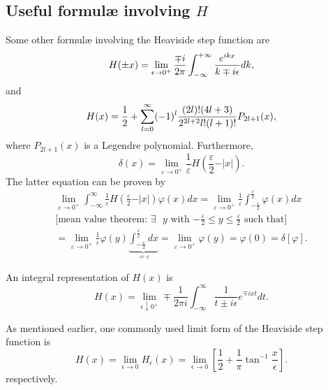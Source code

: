 \subsection{Useful formul\ae{} involving $H$}

Some other formul\ae{}  involving the Heaviside step function
are
 \begin{equation}
H (\pm x)=\lim_{\epsilon \rightarrow 0^+}{\mp i\over 2\pi
 }\int_{-\infty}^{+\infty} {e^{ikx}\over k\mp i\epsilon}dk,
 \end{equation}
and
 \begin{equation}
H (x)
={1\over 2}
+
\sum_{l=0}^\infty (-1)^l {(2l)!(4l+3)\over 2^{2l+2}l!(l+1)!}
P_{2l+1} (x),
 \end{equation}
where $P_{2l+1} (x)$ is a Legendre polynomial.
Furthermore,
\begin{equation}
\delta(x)=
\lim_{\varepsilon \rightarrow 0^+}  \frac{1}{\varepsilon } H\left( \frac{\varepsilon }{2} -\vert x\vert\right) .
\end{equation}
{\color{OliveGreen}
\bproof
The latter equation can
be proven by
\begin{equation}
\begin{split}
\lim_{\varepsilon \rightarrow 0^+}  \int_{-\infty}^\infty
\frac{1}{\varepsilon } H\left( \frac{\varepsilon }{2} -\vert x\vert\right) \varphi(x) dx
=
\lim_{\varepsilon \rightarrow 0^+} \frac{1}{\varepsilon } \int_{-\frac{\varepsilon}{2}}^{\frac{\varepsilon}{2}}
\varphi(x) dx
\\
\textrm{[mean value theorem: $\exists$  $y$ with $-\frac{\varepsilon}{2}\le y \le \frac{\varepsilon}{2}$ such that]} \\
=\lim_{\varepsilon \rightarrow 0^+} \frac{1}{\varepsilon }\varphi(y) \underbrace{\int_{-\frac{\varepsilon}{2}}^{\frac{\varepsilon}{2}} dx}_{=\varepsilon }
=\lim_{\varepsilon \rightarrow 0^+}  \varphi(y)  =   \varphi(0) =\delta [\varphi ].
\end{split}
\end{equation}
\eproof
}

An integral representation of $H(x)$ is
 \begin{equation}
H (x)
=\lim_{\epsilon \downarrow 0^+} \mp \frac{1}{2\pi i}
\int_{-\infty}^\infty
 \frac{1}{t \pm i\epsilon}e^{\mp ixt} dt.
 \end{equation}


As mentioned earlier, one commonly used limit form  of the Heaviside step function is
\begin{equation}
H(x)= \lim_{\epsilon \rightarrow 0} H_\epsilon (x)=\lim_{\epsilon \rightarrow 0}   \left[ \frac{1 }{2} + \frac{1 }{\pi} \tan^{-1}  \frac{x}{\epsilon } \right] .
\end{equation}
respectively.

